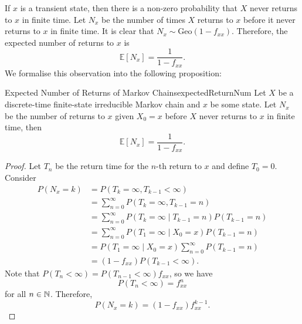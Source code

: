 \documentclass[math, code]{amznotes}
\theoremstyle{remark}
\begin{document}
If $x$ is a transient state, then there is a non-zero probability that $X$ never returns to $x$ in finite time. Let $N_x$ be the number of times $X$ returns to $x$ before it never returns to $x$ in finite time. It is clear that $N_x \sim \mathrm{Geo}\left(1 - f_{xx}\right)$. Therefore, the expected number of returns to $x$ is 
\begin{equation*}
    \mathbb{E}\left[N_x\right] = \frac{1}{1 - f_{xx}}.
\end{equation*}
We formalise this observation into the following proposition:
\begin{probox}{Expected Number of Returns of Markov Chains}{expectedReturnNum}
    Let $X$ be a discrete-time finite-state irreducible Markov chain and $x$ be some state. Let $N_x$ be the number of returns to $x$ given $X_0 = x$ before $X$ never returns to $x$ in finite time, then 
    \begin{equation*}
        \mathbb{E}\left[N_x\right] = \frac{1}{1 - f_{xx}}.
    \end{equation*}
    \tcblower
    \begin{proof}
        Let $T_n$ be the return time for the $n$-th return to $x$ and define $T_0 = 0$. Consider 
        \begin{align*}
            P\left(N_x = k\right) & = P\left(T_k = \infty, T_{k - 1} < \infty\right) \\
            & = \sum_{n = 0}^{\infty}P\left(T_k = \infty, T_{k - 1} = n\right) \\
            & = \sum_{n = 0}^{\infty}P\left(T_k = \infty \mid T_{k - 1} = n\right)P\left(T_{k - 1} = n\right) \\
            & = \sum_{n = 0}^{\infty}P\left(T_1 = \infty \mid X_0 = x\right)P\left(T_{k - 1} = n\right) \\
            & = P\left(T_1 = \infty \mid X_0 = x\right)\sum_{n = 0}^{\infty}P\left(T_{k - 1} = n\right) \\
            & = \left(1 - f_{xx}\right)P\left(T_{k - 1} < \infty\right).
        \end{align*}
        Note that $P\left(T_n < \infty\right) = P\left(T_{n - 1} < \infty\right)f_{xx}$, so we have 
        \begin{equation*}
            P\left(T_n < \infty\right) = f_{xx}^n
        \end{equation*}
        for all $n \in \mathbb{N}$. Therefore, 
        \begin{equation*}
            P\left(N_x = k\right) = \left(1 - f_{xx}\right)f_{xx}^{k - 1}.
        \end{equation*}
    \end{proof}
\end{probox}
\end{document}
